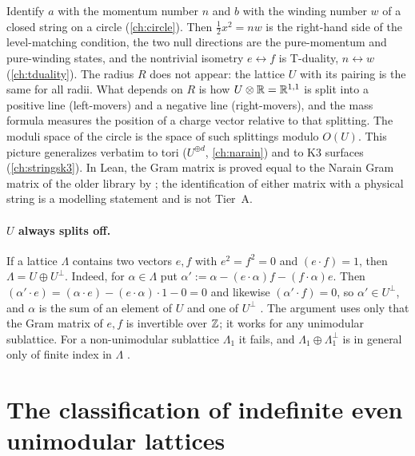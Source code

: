 \begin{physicsbox}
Identify $a$ with the momentum number $n$ and $b$ with the winding number $w$ of a closed
string on a circle (\cref{ch:circle}). Then $\frac12x^2=nw$ is the right-hand side of the
level-matching condition, the two null directions are the pure-momentum and pure-winding
states, and the nontrivial isometry $e\leftrightarrow f$ is T-duality, $n\leftrightarrow w$
(\cref{ch:tduality}). The radius $R$ does not appear: the lattice $U$ with its pairing is the
same for all radii. What depends on $R$ is how $U\otimes\mathbb{R}=\mathbb{R}^{1,1}$ is split into a positive
line (left-movers) and a negative line (right-movers), and the mass formula measures the
position of a charge vector relative to that splitting. The moduli space of the circle is the
space of such splittings modulo $O(U)$. This picture generalizes verbatim to tori
($U^{\oplus d}$, \cref{ch:narain}) and to K3 surfaces (\cref{ch:stringsk3}). In Lean, the
Gram matrix  is proved equal to the Narain Gram matrix of the older
library by ; the identification of either matrix with a
physical string is a modelling statement and is not Tier~A.
\end{physicsbox}

\paragraph{$U$ always splits off.} If a lattice $\Lambda$ contains two vectors $e,f$ with
$e^2=f^2=0$ and $(e\cdot f)=1$, then $\Lambda=U\oplus U^\perp$. Indeed, for $\alpha\in\Lambda$
put $\alpha':=\alpha-(e\cdot\alpha)f-(f\cdot\alpha)e$. Then
$(\alpha'\cdot e)=(\alpha\cdot e)-(e\cdot\alpha)\cdot1-0=0$ and likewise
$(\alpha'\cdot f)=0$, so $\alpha'\in U^\perp$, and $\alpha$ is the sum of an element of $U$
and one of $U^\perp$ . The argument uses only that
the Gram matrix of $e,f$ is invertible over $\mathbb{Z}$; it works for any unimodular sublattice. For
a non-unimodular sublattice $\Lambda_1$ it fails, and $\Lambda_1\oplus\Lambda_1^\perp$ is in
general only of finite index in $\Lambda$ .

\section{The classification of indefinite even unimodular lattices}
\label{sec:lattices:classification}

